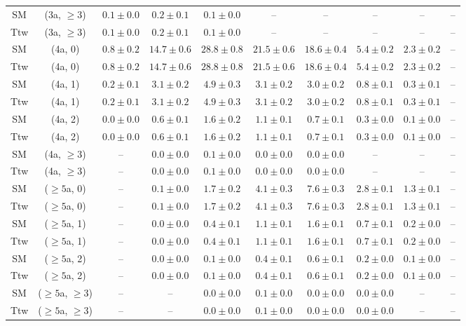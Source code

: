 \begin{table}[h!]
{\begin{tabular}{cccccccccc}
	SM & (3a, $\ge3$) & $0.1\pm 0.0$ & $0.2\pm 0.1$ & $0.1\pm 0.0$ & -- & -- & -- & -- & -- \\[0.5ex] 
	Ttw & (3a, $\ge3$) & $0.1\pm 0.0$ & $0.2\pm 0.1$ & $0.1\pm 0.0$ & -- & -- & -- & -- & -- \\[0.5ex] 
	SM & (4a, 0) & $0.8\pm 0.2$ & $14.7\pm 0.6$ & $28.8\pm 0.8$ & $21.5\pm 0.6$ & $18.6\pm 0.4$ & $5.4\pm 0.2$ & $2.3\pm 0.2$ & -- \\[0.5ex] 
	Ttw & (4a, 0) & $0.8\pm 0.2$ & $14.7\pm 0.6$ & $28.8\pm 0.8$ & $21.5\pm 0.6$ & $18.6\pm 0.4$ & $5.4\pm 0.2$ & $2.3\pm 0.2$ & -- \\[0.5ex] 
	SM & (4a, 1) & $0.2\pm 0.1$ & $3.1\pm 0.2$ & $4.9\pm 0.3$ & $3.1\pm 0.2$ & $3.0\pm 0.2$ & $0.8\pm 0.1$ & $0.3\pm 0.1$ & -- \\[0.5ex] 
	Ttw & (4a, 1) & $0.2\pm 0.1$ & $3.1\pm 0.2$ & $4.9\pm 0.3$ & $3.1\pm 0.2$ & $3.0\pm 0.2$ & $0.8\pm 0.1$ & $0.3\pm 0.1$ & -- \\[0.5ex] 
	SM & (4a, 2) & $0.0\pm 0.0$ & $0.6\pm 0.1$ & $1.6\pm 0.2$ & $1.1\pm 0.1$ & $0.7\pm 0.1$ & $0.3\pm 0.0$ & $0.1\pm 0.0$ & -- \\[0.5ex] 
	Ttw & (4a, 2) & $0.0\pm 0.0$ & $0.6\pm 0.1$ & $1.6\pm 0.2$ & $1.1\pm 0.1$ & $0.7\pm 0.1$ & $0.3\pm 0.0$ & $0.1\pm 0.0$ & -- \\[0.5ex] 
	SM & (4a, $\ge3$) & -- & $0.0\pm 0.0$ & $0.1\pm 0.0$ & $0.0\pm 0.0$ & $0.0\pm 0.0$ & -- & -- & -- \\[0.5ex] 
	Ttw & (4a, $\ge3$) & -- & $0.0\pm 0.0$ & $0.1\pm 0.0$ & $0.0\pm 0.0$ & $0.0\pm 0.0$ & -- & -- & -- \\[0.5ex] 
	SM & ($\ge5$a, 0) & -- & $0.1\pm 0.0$ & $1.7\pm 0.2$ & $4.1\pm 0.3$ & $7.6\pm 0.3$ & $2.8\pm 0.1$ & $1.3\pm 0.1$ & -- \\[0.5ex] 
	Ttw & ($\ge5$a, 0) & -- & $0.1\pm 0.0$ & $1.7\pm 0.2$ & $4.1\pm 0.3$ & $7.6\pm 0.3$ & $2.8\pm 0.1$ & $1.3\pm 0.1$ & -- \\[0.5ex] 
	SM & ($\ge5$a, 1) & -- & $0.0\pm 0.0$ & $0.4\pm 0.1$ & $1.1\pm 0.1$ & $1.6\pm 0.1$ & $0.7\pm 0.1$ & $0.2\pm 0.0$ & -- \\[0.5ex] 
	Ttw & ($\ge5$a, 1) & -- & $0.0\pm 0.0$ & $0.4\pm 0.1$ & $1.1\pm 0.1$ & $1.6\pm 0.1$ & $0.7\pm 0.1$ & $0.2\pm 0.0$ & -- \\[0.5ex] 
	SM & ($\ge5$a, 2) & -- & $0.0\pm 0.0$ & $0.1\pm 0.0$ & $0.4\pm 0.1$ & $0.6\pm 0.1$ & $0.2\pm 0.0$ & $0.1\pm 0.0$ & -- \\[0.5ex] 
	Ttw & ($\ge5$a, 2) & -- & $0.0\pm 0.0$ & $0.1\pm 0.0$ & $0.4\pm 0.1$ & $0.6\pm 0.1$ & $0.2\pm 0.0$ & $0.1\pm 0.0$ & -- \\[0.5ex] 
	SM & ($\ge5$a, $\ge3$) & -- & -- & $0.0\pm 0.0$ & $0.1\pm 0.0$ & $0.0\pm 0.0$ & $0.0\pm 0.0$ & -- & -- \\[0.5ex] 
	Ttw & ($\ge5$a, $\ge3$) & -- & -- & $0.0\pm 0.0$ & $0.1\pm 0.0$ & $0.0\pm 0.0$ & $0.0\pm 0.0$ & -- & -- \\[0.5ex] 
	\hline
	\hline
\end{tabular}}
\end{table}
